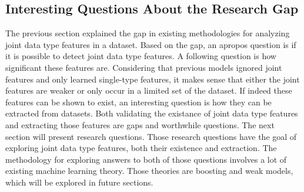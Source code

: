 \subsection{Interesting Questions About the Research Gap}

The previous section explained the gap in existing methodologies for analyzing joint data type features in a dataset.  Based on the gap, an apropos question is if it is possible to detect joint data type features.  A following question is how significant these features are.  Considering that previous models ignored joint features and only learned single-type features, it makes sense that either the joint features are weaker or only occur in a limited set of the dataset. If indeed these features can be shown to exist, an interesting question is how they can be extracted from datasets.  Both validating the existance of joint data type features and extracting those features are gaps and worthwhile questions.  The next section will present research questions.  Those research questions have the goal of exploring joint data type features, both their existence and extraction.  The methodology for exploring answers to both of those questions involves a lot of existing machine learning theory.  Those theories are boosting and weak models, which will be explored in future sections.



